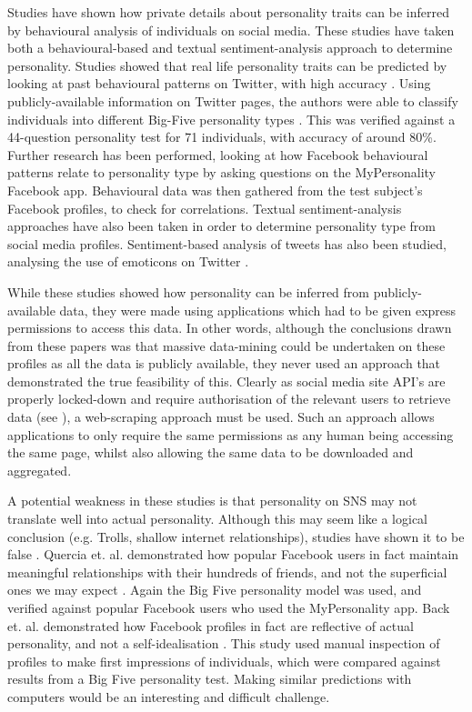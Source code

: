 Studies have shown how private details about personality traits can be inferred by behavioural analysis of individuals on social media. These studies have taken both a behavioural-based and textual sentiment-analysis approach to determine personality. Studies showed that real life personality traits can be predicted by looking at past behavioural patterns on Twitter, with high accuracy \cite{}. Using publicly-available information on Twitter pages, the authors were able to classify individuals into different Big-Five personality types \cite{}. This was verified against a 44-question personality test for 71 individuals, with accuracy of around 80\%. Further research has been performed, looking at how Facebook behavioural patterns relate to personality type by asking questions on the MyPersonality Facebook app. Behavioural data was then gathered from the test subject's Facebook profiles, to check for correlations. Textual sentiment-analysis approaches have also been taken in order to determine personality type 
from social media profiles. Sentiment-based analysis of tweets has also been studied, analysing the use of emoticons on Twitter \cite{}.

While these studies showed how personality can be inferred from publicly-available data, they were made using applications which had to be given express permissions to access this data. In other words, although the conclusions drawn from these papers was that massive data-mining could be undertaken on these profiles as all the data is publicly available, they never used an approach that demonstrated the true feasibility of this. Clearly as social media site API's are properly locked-down and require authorisation of the relevant users to retrieve data (see \cite{}), a web-scraping approach must be used. Such an approach allows applications to only require the same permissions as any human being accessing the same page, whilst also allowing the same data to be downloaded and aggregated. 

A potential weakness in these studies is that personality on SNS may not translate well into actual personality. Although this may seem like a logical conclusion (e.g. Trolls, shallow internet relationships), studies have shown it to be false \cite{}. Quercia et. al. demonstrated how popular Facebook users in fact maintain meaningful relationships with their hundreds of friends, and not the superficial ones we may expect \cite{}. Again the Big Five personality model was used, and verified against popular Facebook users who used the MyPersonality app. Back et. al. demonstrated how Facebook profiles in fact are reflective of actual personality, and not a self-idealisation \cite{}. This study used manual inspection of profiles to make first impressions of individuals, which were compared against results from a Big Five personality test. Making similar predictions with computers would be an interesting and difficult challenge. 

